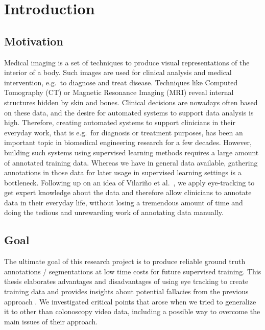 \chapter{Introduction}
\label{chap:introduction}

\section{Motivation}
      Medical imaging is a set of techniques to produce visual representations of the interior of a body. 
      Such images are used for clinical analysis and medical intervention, e.g.\ to diagnose and treat disease. 
      Techniques like Computed Tomography (CT) or Magnetic Resonance Imaging (MRI) reveal internal structures hidden by skin and bones. 
      Clinical decisions are nowadays often based on these data, and the desire for automated systems to support data analysis is high. 
      Therefore, creating automated systems to support clinicians in their everyday work, that is e.g.\ for diagnosis or treatment purposes, has been an important topic in biomedical engineering research for a few decades. 
      However, building such systems using supervised learning methods requires a large amount of annotated training data. 
      Whereas we have in general data available, gathering annotations in those data for later usage in supervised learning settings is a bottleneck. 
      Following up on an idea of Vilari\~no et al.\ \cite{vilarino2007automatic}, we apply eye-tracking to get expert knowledge about the data and therefore allow clinicians to annotate data in their everyday life, without losing a tremendous amount of time and doing the tedious and unrewarding work of annotating data manually.
  
\section{Goal}
The ultimate goal of this research project is to produce reliable ground truth annotations / segmentations at low time costs for future supervised training. 
This thesis elaborates advantages and disadvantages of using eye tracking to create training data and provides insights about potential fallacies from the previous approach \cite{vilarino2007automatic}. 
We investigated critical points that arose when we tried to generalize it to other than colonoscopy video data, including a possible way to overcome the main issues of their approach.

